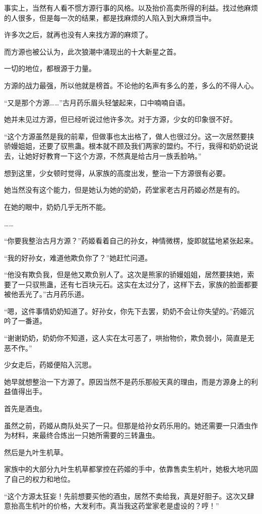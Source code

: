 \begin{this_body}
事实上，当然有人看不惯方源行事的风格。以及抬价高卖所得的利益。找过他麻烦的人很多，但是每一次的结果，都是找麻烦的人陷入到大麻烦当中。

许多次之后，就再也没有人来找方源的麻烦了。

而方源也被公认为，此次狼潮中涌现出的十大新星之首。

一切的地位，都根源于力量。

方源的战力最强，所以他就是榜首。不论他的名声有多么的差，多么的不得人心。

“又是那个方源……”古月药乐眉头轻皱起来，口中喃喃自语。

她并未见过方源，但已经听说过他许多次。对于方源，少女的印象很不好。

“这个方源虽然是我的前辈，但做事也太出格了，做人也很过分。这一次居然要挟骄嫚姐姐，还要了驭熊蛊。根本就不顾及我们两家的盟约。不行，我得和奶奶说说去，让她好好教育一下这个方源，不然真是给古月一族丢脸呐。”

想到这里，少女顿时觉得，从家族的高度出发，整治一下方源很有必要。

她当然没有这个能力，但是她认为她的奶奶，药堂家老古月药姬必然是有的。

在她的眼中，奶奶几乎无所不能。

……

“你要我整治古月方源？”药姬看着自己的孙女，神情微楞，旋即就猛地紧张起来。

“我的好孙女，难道他欺负你了？”她赶忙问道。

“他没有欺负我，但是他又欺负别人了。这次是熊家的骄嫚姐姐，居然要挟她，索要了一只驭熊蛊，还有七百块元石。这实在太过分了，这样下去，家族的脸面都要被他丢光了。”古月药乐道。

“嗯，这件事情奶奶知道了。好孙女，你先下去罢，奶奶不会让你失望的。”药姬沉吟了一番道。

“谢谢奶奶，奶奶你不知道，这人实在太可恶了，哄抬物价，欺负弱小，简直是无恶不作。”

少女走后，药姬便陷入沉思。

她早就想整治一下方源了。原因当然不是药乐那般天真的理由，而是方源身上的利益值得出手。

首先是酒虫。

虽然之前，药姬从商队处买了一只。但那是给孙女药乐用的。她还需要一只酒虫作为材料，来最终合炼出一只她所需要的三转蛊虫。

然后是九叶生机草。

家族中的大部分九叶生机草都掌控在药姬的手中，依靠售卖生机叶，她极大地巩固了自己的权力和地位。

“这个方源太狂妄！先前想要买他的酒虫，居然不卖给我，真是好胆子。这次又肆意抬高生机叶的价格，大发利市。真当我这药堂家老是虚设的？哼！”

\end{this_body}

